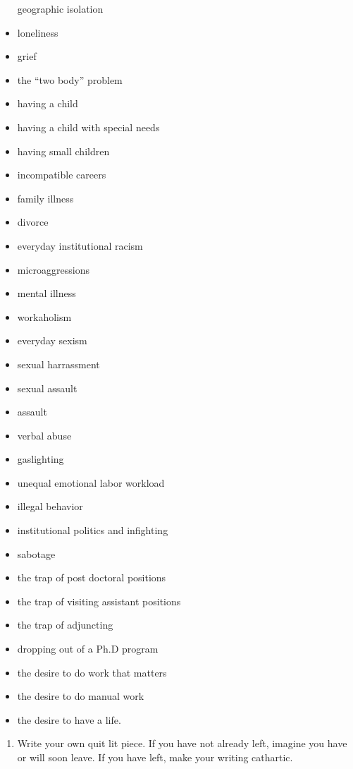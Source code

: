 \documentclass[]{book}
\providecommand{\tightlist}{%
  \setlength{\itemsep}{0pt}\setlength{\parskip}{0pt}}
\theoremstyle{definition}
\theoremstyle{definition}
\theoremstyle{definition}
\theoremstyle{remark}
\begin{document}
\begin{itemize}
  geographic isolation
\item
  loneliness
\item
  grief
\item
  the ``two body'' problem
\item
  having a child
\item
  having a child with special needs
\item
  having small children
\item
  incompatible careers
\item
  family illness
\item
  divorce
\item
  everyday institutional racism
\item
  microaggressions
\item
  mental illness
\item
  workaholism
\item
  everyday sexism
\item
  sexual harrassment
\item
  sexual assault
\item
  assault
\item
  verbal abuse
\item
  gaslighting
\item
  unequal emotional labor workload
\item
  illegal behavior
\item
  institutional politics and infighting
\item
  sabotage
\item
  the trap of post doctoral positions
\item
  the trap of visiting assistant positions
\item
  the trap of adjuncting
\item
  dropping out of a Ph.D program
\item
  the desire to do work that matters
\item
  the desire to do manual work
\item
  the desire to have a life.
\end{itemize}

\begin{enumerate}
\def\labelenumi{\arabic{enumi}.}
\setcounter{enumi}{1}
\tightlist
\item
  Write your own quit lit piece. If you have not already left, imagine
  you have or will soon leave. If you have left, make your writing
  cathartic.
\end{enumerate}
\end{document}
